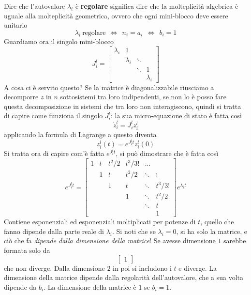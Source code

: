 Dire che l'autovalore $\lambda _i$ è \textbf{regolare} significa dire che la molteplicità algebrica è uguale alla molteplicità geometrica, ovvero che ogni mini-blocco deve essere unitario
\begin{equation*}
	\boxed{\lambda _i \ \text{regolare} \ \ \iff \ \ n_i =a_i \ \ \iff \ \ b_i =1}
\end{equation*}
Guardiamo ora il singolo mini-blocco
\begin{equation*}
	J^l_i =\begin{bmatrix}
	\lambda _i & 1 &  & \\
	& \lambda _i & \ddots  & \\
	&  & \ddots  & 1\\
	&  &  & \lambda _i
	\end{bmatrix}
\end{equation*}
A cosa ci è servito questo? Se la matrice è diagonalizzabile riusciamo a decomporre $z$ in $n$ sottosistemi tra loro indipendenti, se non lo è posso fare questa decomposizione in sistemi che tra loro non interagiscono, quindi si tratta di capire come funziona il singolo $J^l_i$: la sua micro-equazione di stato è fatta così
\begin{equation*}
	\dot{z}^l_i =J^l_i z^l_i
\end{equation*}
applicando la formula di Lagrange a questo diventa
\begin{equation*}
	z^l_i\left(t\right) =e^{J^l_i t} z^l_i\left(0\right)
\end{equation*}
Si tratta ora di capire com'è fatta $e^{J^l_i t}$, si può dimostrare che è fatta così
\begin{equation*}
	e^{J^l_i t} =\begin{bmatrix}
	1 & t & t^2 /2 & t^3/3! & \dotsc  & \\
	& 1 & t & t^2 /2&\ddots  & \vdots \\
	&  & 1 & t & \ddots & t^3/3!\\
	&  &  & 1 & \ddots& t^2 /2\\
	&  &  &  & \ddots& t\\
    &  &  &  &  & 1
	\end{bmatrix} e^{\lambda _i t}
\end{equation*}
Contiene esponenziali ed esponenziali moltiplicati per potenze di $t$, quello che fanno dipende dalla parte reale di $\lambda _i$. Si noti che se $\lambda _i =0$, si ha solo la matrice, e ciò che fa \textit{dipende dalla dimensione della matrice}! Se avesse dimensione $1$ sarebbe formata solo da
\begin{equation*}
	\begin{bmatrix}
		1 
	\end{bmatrix}
\end{equation*}
che non diverge. Dalla dimensione $2$ in poi si includono i $t$ e diverge. La dimensione della matrice dipende dalla regolarità dell'autovalore, che a sua volta dipende da $b_i$. La dimensione della matrice è $1$ se $b_i =1$.

